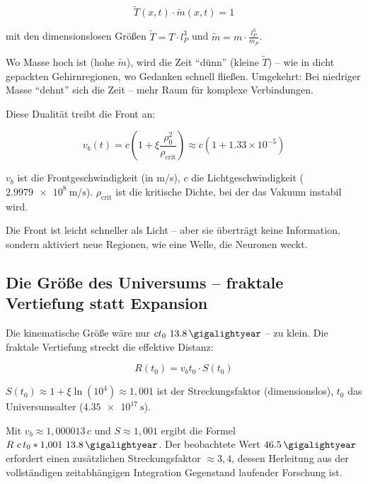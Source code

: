 	\begin{equation}
		\tilde{T}(x,t) \cdot \tilde{m}(x,t) = 1
	\end{equation}
	
	mit den dimensionslosen Größen $\tilde{T} = T \cdot l_P^3$ und $\tilde{m} = m \cdot \frac{l_P^3}{m_P}$.
	
	Wo Masse hoch ist (hohe $\tilde{m}$), wird die Zeit \enquote{dünn} (kleine $\tilde{T}$) – wie in dicht gepackten Gehirnregionen, wo Gedanken schnell fließen. Umgekehrt: Bei niedriger Masse \enquote{dehnt} sich die Zeit – mehr Raum für komplexe Verbindungen.
	
	Diese Dualität treibt die Front an:
	
	\begin{equation}
		v_b(t) = c \left( 1 + \xi \frac{\rho_0^2}{\rho_{\text{crit}}} \right) \approx c \left(1 + 1.33 \times 10^{-5}\right)
	\end{equation}
	
	$v_b$ ist die Frontgeschwindigkeit (in m/s), $c$ die Lichtgeschwindigkeit ($\SI{2.9979e8}{\meter\per\second}$). $\rho_{\text{crit}}$ ist die kritische Dichte, bei der das Vakuum instabil wird.
	
	Die Front ist leicht schneller als Licht – aber sie überträgt keine Information, sondern aktiviert neue Regionen, wie eine Welle, die Neuronen weckt.
	
	\subsection*{Die Größe des Universums – fraktale Vertiefung statt Expansion}
	
	Die kinematische Größe wäre nur $c t_0 \approx \SI{13.8}{\gigalightyear}$ – zu klein. Die fraktale Vertiefung streckt die effektive Distanz:
	
	\begin{equation}
		R(t_0) = v_b t_0 \cdot S(t_0)
	\end{equation}
	
	$S(t_0) \approx 1 + \xi \ln(10^4) \approx 1{,}001$ ist der Streckungsfaktor (dimensionslos), $t_0$ das Universumsalter ($\SI{4.35e17}{\second}$).
	
	Mit $v_b \approx 1{,}000013\,c$ und $S \approx 1{,}001$ ergibt die Formel $R \approx c\,t_0 \cdot 1{,}001 \approx \SI{13.8}{\gigalightyear}$. Der beobachtete Wert $\SI{46.5}{\gigalightyear}$ erfordert einen zusätzlichen Streckungsfaktor $\approx 3{,}4$, dessen Herleitung aus der vollständigen zeitabhängigen Integration Gegenstand laufender Forschung ist.
	
